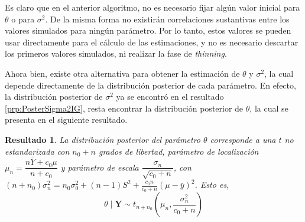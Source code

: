 \documentclass[
  10pt,
  spanish,
]{book}
\newtheorem{proposition}{Resultado}[chapter]
\theoremstyle{definition}
\theoremstyle{definition}
\theoremstyle{definition}
\theoremstyle{definition}
\theoremstyle{remark}
\begin{document}
Es claro que en el anterior algoritmo, no es necesario fijar algún valor inicial para \(\theta\) o para \(\sigma^2\). De la misma forma no existirán correlaciones sustantivas entre los valores simulados para ningún parámetro. Por lo tanto, estos valores se pueden usar directamente para el cálculo de las estimaciones, y no es necesario descartar los primeros valores simulados, ni realizar la fase de \emph{thinning}.

Ahora bien, existe otra alternativa para obtener la estimación de \(\theta\) y \(\sigma^2\), la cual depende directamente de la distribución posterior de cada parámetro. En efecto, la distribución posterior de \(\sigma^2\) ya se encontró en el resultado \ref{prp:PosterSigma2IG}, resta encontrar la distribución posterior de \(\theta\), la cual se presenta en el siguiente resultado.

\begin{proposition}
\protect\hypertarget{prp:PosThetaTnoestandar}{}{\label{prp:PosThetaTnoestandar} }La distribución posterior del parámetro \(\theta\) corresponde a una \(t\) no estandarizada con \(n_0+n\) grados de libertad, parámetro de localización \(\mu_n=\dfrac{n\bar{Y}+c_0\mu}{n+c_0}\) y parámetro de escala \(\dfrac{\sigma_n}{\sqrt{c_0+n}}\), con \((n+n_0)\sigma^2_n=n_0\sigma^2_0+(n-1)S^2+\frac{c_0n}{c_0+n}(\mu-\bar{y})^2\). Esto es,
\begin{equation*}
\theta \mid \mathbf{Y} \sim t_{n+n_0}\left(\mu_n, \frac{\sigma^2_n}{c_0+n}\right)
\end{equation*}
\end{proposition}
\end{document}
